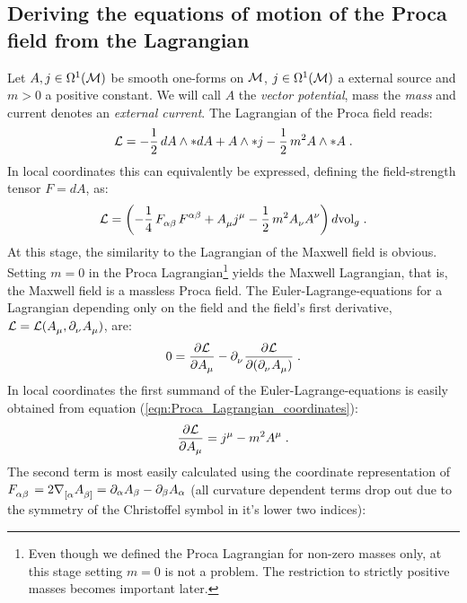 \subsection{Deriving the equations of motion of the Proca field from the Lagrangian}
%
Let $A, j \in \Omega ^1 (\mathcal{M})$ be smooth one-forms on $\mathcal{M}$, $j \in \Omega^1(\mathcal{M})$ a external source and $m >0$ a positive constant. We will call $A$ the \emph{vector potential}, \gls{mass} the \emph{mass} and \gls{current} denotes an \emph{external current}. The Lagrangian of the Proca field reads:
%
\begin{align}
\mathcal{L} = -\frac{1}{2} \, dA  \wedge  *dA + A \wedge *j - \frac{1}{2} \, m^2 A \wedge *A \;.
\end{align}
In local coordinates this can equivalently be expressed, defining the field-strength tensor $F = dA$, as:
\begin{align}
\Ldens = \left( -\frac{1}{4}\, F\indices{_{\alpha\beta}} F\indices{^{\alpha\beta}} + A\indices{_\mu} j^\mu - \frac{1}{2} \, m^2 A\indices{_\nu} A\indices{^\nu} \right) \dvolg \formspace. \label{eqn:Proca_Lagrangian_coordinates}
\end{align}
At this stage, the similarity to the Lagrangian of the Maxwell field is obvious. Setting $m=0$ in the Proca Lagrangian\footnote{Even though we defined the Proca Lagrangian for non-zero masses only, at this stage setting $m=0$ is not a problem. The restriction to strictly positive masses becomes important later.} yields the Maxwell Lagrangian, that is, the Maxwell field is a massless Proca field.
%
%
The Euler-Lagrange-equations for a Lagrangian depending only on the field and the field's first derivative, $\Ldens = \Ldens(A\indices{_\mu}, \partial\indices{_\nu}A\indices{_\mu})$, are:
\begin{align}
0 = \frac{\partial \Ldens}{\partial A\indices{_\mu}} - \partial\indices{_\nu} \frac{\partial \Ldens}{\partial(\partial\indices{_\nu} A\indices{_\mu})} \formspace.
\end{align}
In local coordinates the first summand of the Euler-Lagrange-equations is easily obtained from equation (\ref{eqn:Proca_Lagrangian_coordinates}):
\begin{align}
\frac{\partial \Ldens}{\partial A\indices{_\mu}} = j^\mu - m^2 A^\mu \formspace.
\end{align}
The second term is most easily calculated using the coordinate representation of $F\indices{_{\alpha\beta}} = 2 \nabla\indices{_{[\alpha}} A\indices{_{\beta ]}} = \partial_\alpha A_\beta - \partial_\beta A_\alpha$ (all curvature dependent terms drop out due to the symmetry of the Christoffel symbol in it's lower two indices):
